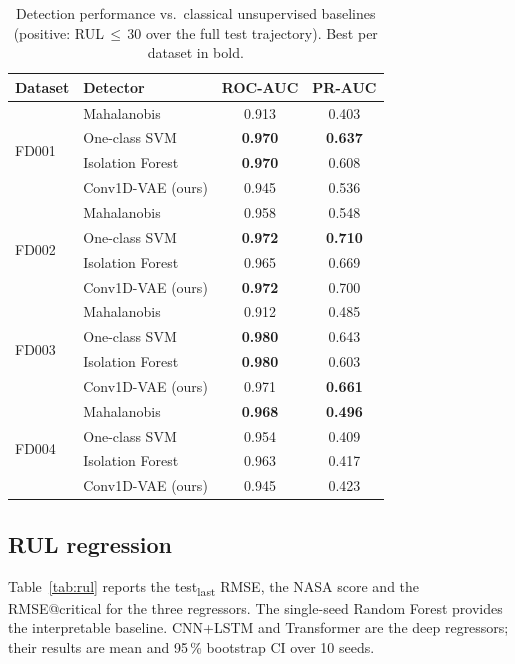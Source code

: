 \documentclass[5p,times,authoryear]{elsarticle}
\begin{document}
\begin{table}[!t]
\centering
\caption{Detection performance vs.\ classical unsupervised baselines (positive: RUL\,$\le$\,30 over the full test trajectory). Best per dataset in bold.}
\label{tab:detbaselines}
\small
\begin{tabular}{llcc}
\toprule
Dataset & Detector & ROC-AUC & PR-AUC \\
\midrule
\multirow{4}{*}{FD001}
 & Mahalanobis        & 0.913          & 0.403 \\
 & One-class SVM      & \textbf{0.970} & \textbf{0.637} \\
 & Isolation Forest   & \textbf{0.970} & 0.608 \\
 & Conv1D-VAE (ours)  & 0.945          & 0.536 \\
\multirow{4}{*}{FD002}
 & Mahalanobis        & 0.958          & 0.548 \\
 & One-class SVM      & \textbf{0.972} & \textbf{0.710} \\
 & Isolation Forest   & 0.965          & 0.669 \\
 & Conv1D-VAE (ours)  & \textbf{0.972} & 0.700 \\
\multirow{4}{*}{FD003}
 & Mahalanobis        & 0.912          & 0.485 \\
 & One-class SVM      & \textbf{0.980} & 0.643 \\
 & Isolation Forest   & \textbf{0.980} & 0.603 \\
 & Conv1D-VAE (ours)  & 0.971          & \textbf{0.661} \\
\multirow{4}{*}{FD004}
 & Mahalanobis        & \textbf{0.968} & \textbf{0.496} \\
 & One-class SVM      & 0.954          & 0.409 \\
 & Isolation Forest   & 0.963          & 0.417 \\
 & Conv1D-VAE (ours)  & 0.945          & 0.423 \\
\bottomrule
\end{tabular}
\end{table}

\subsection{RUL regression}\label{sec:results-rul}

Table~\ref{tab:rul} reports the test\textsubscript{last} RMSE, the NASA score and the RMSE@critical for the three regressors. The single-seed Random Forest provides the interpretable baseline. CNN+LSTM and Transformer are the deep regressors; their results are mean and 95\,\% bootstrap CI over 10 seeds.
\end{document}
